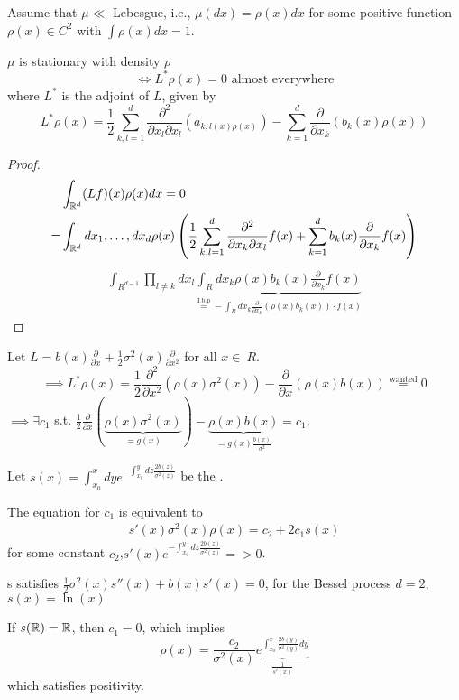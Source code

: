 Assume that $\mu\ll$ Lebesgue, i.e., $\mu(dx)=\rho(x)dx$ for some positive function $\rho(x)\in C^2$ with $\int\rho(x)dx=1$.

\begin{lemma}\label{lem:2.16b}
    $\mu$ is stationary with density $\rho$
    \[\iff L^*\rho(x)=0\text{ almost everywhere}\]
    where $L^*$ is the adjoint of $L$, given by 
    \[L^* \rho(x)=\frac{1}{2}\sum_{k,l=1}^d\frac{\partial^2}{\partial x_l \partial x_l}(a_{k,l(x)\rho(x)})-\sum_{k=1}^d\frac{\partial}{\partial x_k}(b_k(x)\rho(x))\]
\end{lemma}

\begin{proof}
    \begin{align*}
        &\int_{\mathbb{R}^d}(L f)(x)\rho(x)dx=0\\
        =&\int_{\mathbb{R}^d}dx_1,\dots,dx_d\rho(x)\left(\frac{1}{2}\sum_{k,l=1}^d\frac{\partial^2}{\partial x_k\partial x_l} f(x)+\sum_{k=1}^d b_k(x)\frac{\partial}{\partial x_k}f(x)\right)
    \end{align*} 
    \begin{align*}
        \int_{R^{d-1}}\prod_{l\neq k} dx_l\underbrace{\int_R dx_k \rho(x)b_k(x)\frac{\partial }{\partial x_k}f(x)}_{\stackrel{\text{I.b.p}}{=}-\int_R dx_k\frac{\partial}{\partial x_k}(\rho(x)b_k(x)) \cdot f(x)}
    \end{align*}   
\end{proof}

\begin{example}\label{lem:2.17}
    Let $L=b(x)\frac{\partial }{\partial x}+\frac{1}{2}\sigma^2(x)\frac{\partial}{\partial x^2}$ for all $x\in\ R$.
    \[\implies L^*\rho(x)=\frac{1}{2}\frac{\partial^2}{\partial x^2}(\rho(x)\sigma^2(x))-\frac{\partial}{\partial x}(\rho(x)b(x))\stackrel{\text{wanted}}{=}0\]
    $\implies \exists c_1$ s.t. $\frac{1}{2}\frac{\partial}{\partial x}(\underbrace{\rho(x)\sigma^2(x)}_{=g(x)})-\underbrace{\rho(x)b(x)}_{=g(x)\frac{b(x)}{\sigma^2}}=c_1$.

    Let $s(x)=\int_{x_0}^xdye^{-\int_{x_0}^y dz\frac{2b(z)}{\sigma^2(z)}}$ be the .

    The equation for $c_1$ is equivalent to 
    \begin{align*}
        s'(x)\sigma^2(x)\rho(x)=c_2+2c_1s(x)
    \end{align*}
    for some constant $c_2$,$s'(x)e^{-\int_{x_0}^y dz\frac{2b(z)}{\sigma^2(z)}}=>0$.

    s satisfies $\frac{1}{2}\sigma^2(x)s''(x)+b(x)s'(x)=0$, for the Bessel process $d=2$, $s(x)=\ln(x)$

    If $s(\mathbb{R})=\mathbb{R}$, then $c_1=0$, which implies 
    \[\rho(x)=\frac{c_2}{\sigma^2(x)}\underbrace{e^{\int_{x_0}^x\frac{2b(y)}{\sigma^2(y)}dy}}_{\frac{1}{s'(x)}}\]
    which satisfies positivity.
\end{example}

